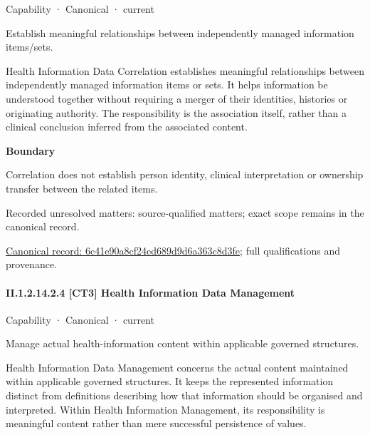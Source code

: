 \label{element:6c41e90a8cf24ed689d9d6a363c8d3fe}
{\small Capability · Canonical · current}\par

Establish meaningful relationships between independently managed information items/sets.



Health Information Data Correlation establishes meaningful relationships between independently managed information items or sets. It helps information be understood together without requiring a merger of their identities, histories or originating authority. The responsibility is the association itself, rather than a clinical conclusion inferred from the associated content.



\textbf{Boundary}



Correlation does not establish person identity, clinical interpretation or ownership transfer between the related items.


{\small Recorded unresolved matters: source-qualified matters; exact scope remains in the canonical record.}\par
{\footnotesize \href{../../../../continuum/strategy/capability/6c41e90a8cf24ed689d9d6a363c8d3fe.md}{Canonical record: 6c41e90a8cf24ed689d9d6a363c8d3fe}; full qualifications and provenance.}\par
\paragraph*{II.1.2.14.2.4 [CT3] Health Information Data Management}
\label{navigation:II.1.2.14.2.4}

\label{element:9565887a92164432933ea97e95af2368}
{\small Capability · Canonical · current}\par

Manage actual health-information content within applicable governed structures.



Health Information Data Management concerns the actual content maintained within applicable governed structures. It keeps the represented information distinct from definitions describing how that information should be organised and interpreted. Within Health Information Management, its responsibility is meaningful content rather than mere successful persistence of values.



